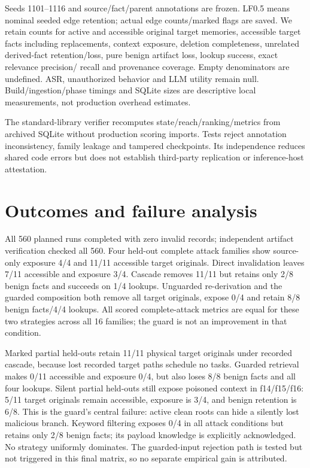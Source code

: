 Seeds 1101--1116 and source/fact/parent annotations are frozen. LF0.5 means nominal seeded edge retention; actual edge counts/marked flags are saved. We retain counts for active and accessible original target memories, accessible target facts including replacements, context exposure, deletion completeness, unrelated derived-fact retention/loss, pure benign artifact loss, lookup success, exact relevance precision/ recall and provenance coverage. Empty denominators are undefined. ASR, unauthorized behavior and LLM utility remain null. Build/ingestion/phase timings and SQLite sizes are descriptive local measurements, not production overhead estimates.

The standard-library verifier recomputes state/reach/ranking/metrics from archived SQLite without production scoring imports. Tests reject annotation inconsistency, family leakage and tampered checkpoints. Its independence reduces shared code errors but does not establish third-party replication or inference-host attestation.

\section{Outcomes and failure analysis}

All 560 planned runs completed with zero invalid records; independent artifact verification checked all 560. Four held-out complete attack families show source- only exposure 4/4 and 11/11 accessible target originals. Direct invalidation leaves 7/11 accessible and exposure 3/4. Cascade removes 11/11 but retains only 2/8 benign facts and succeeds on 1/4 lookups. Unguarded re-derivation and the guarded composition both remove all target originals, expose 0/4 and retain 8/8 benign facts/4/4 lookups. All scored complete-attack metrics are equal for these two strategies across all 16 families; the guard is not an improvement in that condition.

Marked partial held-outs retain 11/11 physical target originals under recorded cascade, because lost recorded target paths schedule no tasks. Guarded retrieval makes 0/11 accessible and exposure 0/4, but also loses 8/8 benign facts and all four lookups. Silent partial held-outs still expose poisoned context in f14/f15/f16: 5/11 target originals remain accessible, exposure is 3/4, and benign retention is 6/8. This is the guard's central failure: active clean roots can hide a silently lost malicious branch. Keyword filtering exposes 0/4 in all attack conditions but retains only 2/8 benign facts; its payload knowledge is explicitly acknowledged. No strategy uniformly dominates. The guarded-input rejection path is tested but not triggered in this final matrix, so no separate empirical gain is attributed.

